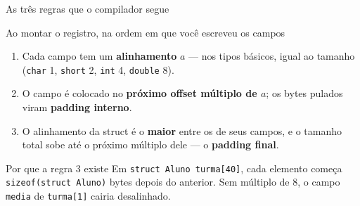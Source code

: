 \documentclass[aspectratio=169]{beamer}
\begin{document}
\begin{frame}{As três regras que o compilador segue}
  \begin{block}{Ao montar o registro, na ordem em que você escreveu os campos}
    \begin{enumerate}
      \item Cada campo tem um \textbf{alinhamento} $a$ --- nos tipos básicos,
        igual ao tamanho (\texttt{char} 1, \texttt{short} 2, \texttt{int} 4,
        \texttt{double} 8).
      \item O campo é colocado no \textbf{próximo offset múltiplo de $a$};
        os bytes pulados viram \textbf{padding interno}.
      \item O alinhamento da struct é o \textbf{maior} entre os de seus campos,
        e o tamanho total sobe até o próximo múltiplo dele --- o
        \textbf{padding final}.
    \end{enumerate}
  \end{block}
  \begin{exampleblock}{Por que a regra 3 existe}
    Em \texttt{struct Aluno turma[40]}, cada elemento começa
    \texttt{sizeof(struct Aluno)} bytes depois do anterior. Sem múltiplo de 8,
    o campo \texttt{media} de \texttt{turma[1]} cairia desalinhado.
  \end{exampleblock}
\end{frame}
\end{document}
